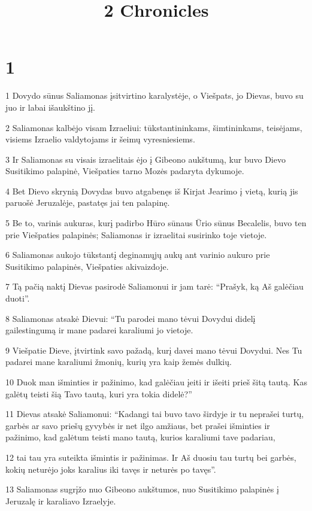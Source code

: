 

\title{
\par 2 Chronicles}

\chapter{1}

\par 1 Dovydo sūnus Saliamonas įsitvirtino karalystėje, o Viešpats, jo Dievas, buvo su juo ir labai išaukštino jį. 
\par 2 Saliamonas kalbėjo visam Izraeliui: tūkstantininkams, šimtininkams, teisėjams, visiems Izraelio valdytojams ir šeimų vyresniesiems. 
\par 3 Ir Saliamonas su visais izraelitais ėjo į Gibeono aukštumą, kur buvo Dievo Susitikimo palapinė, Viešpaties tarno Mozės padaryta dykumoje. 
\par 4 Bet Dievo skrynią Dovydas buvo atgabenęs iš Kirjat Jearimo į vietą, kurią jis paruošė Jeruzalėje, pastatęs jai ten palapinę. 
\par 5 Be to, varinis aukuras, kurį padirbo Hūro sūnaus Ūrio sūnus Becalelis, buvo ten prie Viešpaties palapinės; Saliamonas ir izraelitai susirinko toje vietoje. 
\par 6 Saliamonas aukojo tūkstantį deginamųjų aukų ant varinio aukuro prie Susitikimo palapinės, Viešpaties akivaizdoje. 
\par 7 Tą pačią naktį Dievas pasirodė Saliamonui ir jam tarė: “Prašyk, ką Aš galėčiau duoti”. 
\par 8 Saliamonas atsakė Dievui: “Tu parodei mano tėvui Dovydui didelį gailestingumą ir mane padarei karaliumi jo vietoje. 
\par 9 Viešpatie Dieve, įtvirtink savo pažadą, kurį davei mano tėvui Dovydui. Nes Tu padarei mane karaliumi žmonių, kurių yra kaip žemės dulkių. 
\par 10 Duok man išminties ir pažinimo, kad galėčiau įeiti ir išeiti prieš šitą tautą. Kas galėtų teisti šią Tavo tautą, kuri yra tokia didelė?” 
\par 11 Dievas atsakė Saliamonui: “Kadangi tai buvo tavo širdyje ir tu neprašei turtų, garbės ar savo priešų gyvybės ir net ilgo amžiaus, bet prašei išminties ir pažinimo, kad galėtum teisti mano tautą, kurios karaliumi tave padariau, 
\par 12 tai tau yra suteikta išmintis ir pažinimas. Ir Aš duosiu tau turtų bei garbės, kokių neturėjo joks karalius iki tavęs ir neturės po tavęs”. 
\par 13 Saliamonas sugrįžo nuo Gibeono aukštumos, nuo Susitikimo palapinės į Jeruzalę ir karaliavo Izraelyje. 
